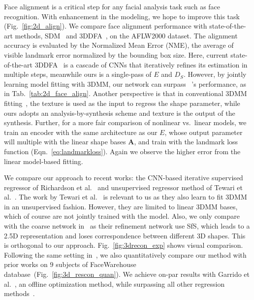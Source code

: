 Face alignment is a critical step for any facial analysis task such as face recognition. 
With enhancement in the modeling, we hope to improve this task (Fig.~\ref{fig:2d_align}). 
We compare face alignment performance with state-of-the-art methods, SDM~\cite{yan2013learn} and 3DDFA~\cite{zhu2016face}, on the AFLW2000 dataset. 
The alignment accuracy is evaluated by the Normalized Mean Error (NME), the average of visible landmark error normalized by the bounding box size.
Here, current state-of-the-art 3DDFA~\cite{zhu2016face} is a cascade of CNNs that iteratively refines its estimation in multiple steps, meanwhile ours is a single-pass of $E$ and $D_S$. 
However, by jointly learning model fitting with 3DMM, our network can surpass ~\cite{zhu2016face}'s performance, as in Tab.~\ref{tab:2d_face_align}.
Another perspective is that in conventional 3DMM fitting~\cite{zhu2016face}, the texture is used as the input to regress the shape parameter, while ours adopts an analysis-by-synthesis scheme and texture is the output of the synthesis.
Further, for a more fair comparison of nonlinear vs.~linear models, we train an encoder with the same architecture as our $E$, whose output parameter will multiple with the linear shape bases $\mathbf{A}$, and train with the landmark loss function (Eqn.~\ref{eq:landmarkloss}). 
Again we observe the higher error from the linear model-based fitting.

We compare our approach to recent works: the CNN-based iterative supervised regressor of Richardson et al.~\cite{richardson20163d, richardson2017learning} and unsupervised regressor method of Tewari et al.~\cite{tewari2017mofa}.
The work by Tewari et al.~\cite{tewari2017mofa} is relevant to us as they also learn to fit 3DMM in an unsupervised fashion. 
However, they are limited to linear 3DMM bases, which of course are not jointly trained with the model. 
Also, we only compare with the coarse network in~\cite{richardson2017learning} as their refinement network use SfS, which leads to a 2.5D representation and loses correspondence between different 3D shapes. 
This is orthogonal to our approach.
Fig.~\ref{fig:3drecon_exp} shows visual comparison. 
Following the same setting in~\cite{tewari2017mofa}, we also quantitatively compare our method with prior works on $9$ subjects of FaceWarehouse database~(Fig.~\ref{fig:3d_rescon_quan}). 
We achieve on-par results with Garrido et al.~\cite{garrido2016reconstruction}, an offline optimization method, while surpassing all other regression methods~\cite{tran2017regressing, richardson2017learning, tewari2017mofa}.


